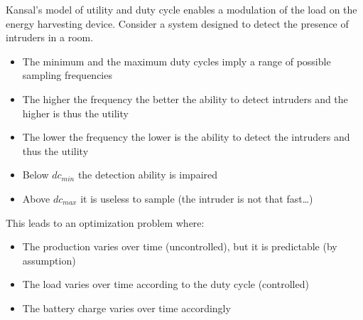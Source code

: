 
Kansal's model of utility and duty cycle enables a modulation of the load on the energy harvesting device.
Consider a system designed to detect the presence of intruders in a room.
\begin{itemize}
   \item The minimum and the maximum duty cycles imply a range of possible sampling frequencies
   \item The higher the frequency the better the ability to detect intruders and the higher is thus the
   utility
   \item The lower the frequency the lower is the ability to detect the intruders and thus the utility
   \item Below $dc_{min}$ the detection ability is impaired
   \item Above $dc_{max}$ it is useless to sample (the intruder is not that fast\dots)
\end{itemize}

This leads to an optimization problem where:
\begin{itemize}
   \item The production varies over time (uncontrolled), but it is predictable (by assumption)
   \item The load varies over time according to the duty cycle (controlled)
   \item The battery charge varies over time accordingly
\end{itemize}

